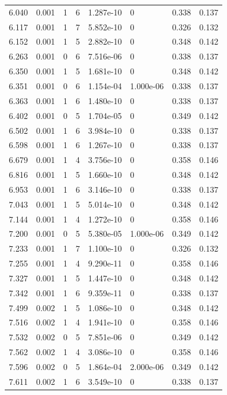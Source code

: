 \documentclass[preview]{standalone}
\begin{document}
{{{\begin{tabular}{L{1.2cm}C{1.2cm} C{0.3cm}C{0.5cm} C{1.4cm}C{1.4cm} C{1.4cm}C{1.4cm}}
  6.040  &  0.001  & 1     &  6 &  1.287e-10  & 0  & 0.338 &  0.137   \\ 
  6.117  &  0.001  & 1     &  7 &  5.852e-10  & 0  & 0.326 &  0.132   \\ 
  6.152  &  0.001  & 1     &  5 &  2.882e-10  & 0  & 0.348 &  0.142   \\ 
  6.263  &  0.001  & 0     &  6 &  7.516e-06  & 0  & 0.338 &  0.137   \\ 
  6.350  &  0.001  & 1     &  5 &  1.681e-10  & 0  & 0.348 &  0.142   \\ 
  6.351  &  0.001  & 0     &  6 &  1.154e-04  & 1.000e-06  & 0.338 &  0.137   \\ 
  6.363  &  0.001  & 1     &  6 &  1.480e-10  & 0  & 0.338 &  0.137   \\ 
  6.402  &  0.001  & 0     &  5 &  1.704e-05  & 0  & 0.349 &  0.142   \\ 
  6.502  &  0.001  & 1     &  6 &  3.984e-10  & 0  & 0.338 &  0.137   \\ 
  6.598  &  0.001  & 1     &  6 &  1.267e-10  & 0  & 0.338 &  0.137   \\ 
  6.679  &  0.001  & 1     &  4 &  3.756e-10  & 0  & 0.358 &  0.146   \\ 
  6.816  &  0.001  & 1     &  5 &  1.660e-10  & 0  & 0.348 &  0.142   \\ 
  6.953  &  0.001  & 1     &  6 &  3.146e-10  & 0  & 0.338 &  0.137   \\ 
  7.043  &  0.001  & 1     &  5 &  5.014e-10  & 0  & 0.348 &  0.142   \\ 
  7.144  &  0.001  & 1     &  4 &  1.272e-10  & 0  & 0.358 &  0.146   \\ 
  7.200  &  0.001  & 0     &  5 &  5.380e-05  & 1.000e-06  & 0.349 &  0.142   \\ 
  7.233  &  0.001  & 1     &  7 &  1.100e-10  & 0  & 0.326 &  0.132   \\ 
  7.255  &  0.001  & 1     &  4 &  9.290e-11  & 0  & 0.358 &  0.146   \\ 
  7.327  &  0.001  & 1     &  5 &  1.447e-10  & 0  & 0.348 &  0.142   \\ 
  7.342  &  0.001  & 1     &  6 &  9.359e-11  & 0  & 0.338 &  0.137   \\ 
  7.499  &  0.002  & 1     &  5 &  1.086e-10  & 0  & 0.348 &  0.142   \\ 
  7.516  &  0.002  & 1     &  4 &  1.941e-10  & 0  & 0.358 &  0.146   \\ 
  7.532  &  0.002  & 0     &  5 &  7.851e-06  & 0  & 0.349 &  0.142   \\ 
  7.562  &  0.002  & 1     &  4 &  3.086e-10  & 0  & 0.358 &  0.146   \\ 
  7.596  &  0.002  & 0     &  5 &  1.864e-04  & 2.000e-06  & 0.349 &  0.142   \\ 
  7.611  &  0.002  & 1     &  6 &  3.549e-10  & 0  & 0.338 &  0.137   \\ 
\hline 
\end{tabular} 

}}}
\end{document}
